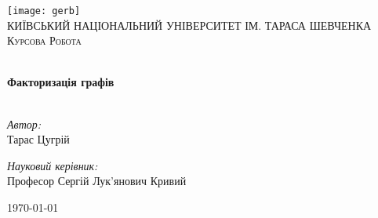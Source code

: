 \begin{titlepage}
  \begin{center}
    
    \texttt{[image: gerb]}\\[1cm]

    \textsc{\LARGE КИЇВСЬКИЙ НАЦІОНАЛЬНИЙ УНІВЕРСИТЕТ ІМ. ТАРАСА ШЕВЧЕНКА}\\[1.5cm]
    \textsc{\Large Курсова Робота}

    \HRule \\[0.4cm]
    { \huge \bfseries Факторизація графів}\\[0.4cm]

    \HRule \\[1.5cm]

    \begin{minipage}{0.4\textwidth}
      \begin{flushleft} \large
        \emph{Автор:}\\
        Тарас {Ц}угрій
      \end{flushleft}
    \end{minipage}
    \begin{minipage}{0.4\textwidth}
      \begin{flushright} \large
        \emph{Науковий керівник:}\\
        Професор {С}ергій {Л}ук'янович {К}ривий
      \end{flushright}
    \end{minipage}

    \vfill

    {\large \today}
    
  \end{center}

\end{titlepage}
